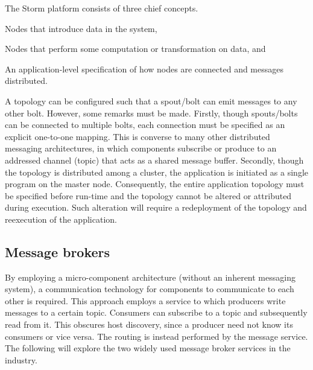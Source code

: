 The Storm platform consists of three chief concepts.
\begin{description}[style=nextline]
\nospace
\item[Spouts] Nodes that introduce data in the system,
\item[Bolts] Nodes that perform some computation or transformation on data, and
\item[Topology] An application-level specification of how nodes are connected and messages distributed.
\end{description}
A topology can be configured such that a spout/bolt can emit messages to any other bolt. However, some remarks must be made. Firstly, though spouts/bolts can be connected to multiple bolts, each connection must be specified as an explicit one-to-one mapping. This is converse to many other distributed messaging architectures, in which components subscribe or produce to an addressed channel (topic) that acts as a shared message buffer. Secondly, though the topology is distributed among a cluster, the application is initiated as a single program on the master node. Consequently, the entire application topology must be specified before run-time and the topology cannot be altered or attributed during execution. Such alteration will require a redeployment of the topology and reexecution of the application.

\subsection{Message brokers}
By employing a micro-component architecture (without an inherent messaging system), a communication technology for components to communicate to each other is required. This approach employs a service to which producers write messages to a certain topic. Consumers can subscribe to a topic and subsequently read from it. This obscures host discovery, since a producer need not know its consumers or vice versa. The routing is instead performed by the message service. The following will explore the two widely used message broker services in the industry.

